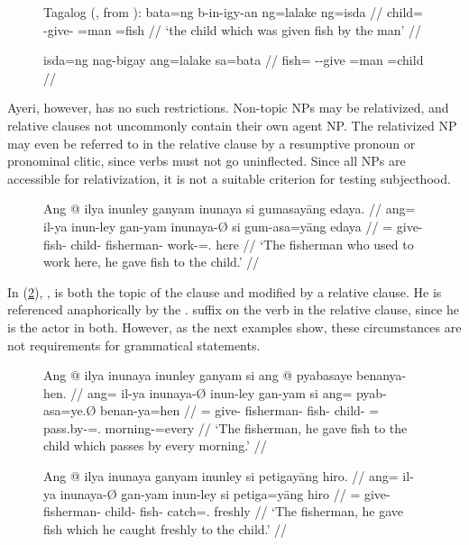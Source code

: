 \begin{figure}[h]
\pex\label{ex:tagrel}%
Tagalog (\cite[24]{kroeger1991}, from \cite[141--142]{foleyvanvalin1984}):
\a\label{ex:tagrel_1}\begingl
	\gla bata=ng b-in-igy-an ng=lalake ng=isda //
	\glb child=\Lnk{} \Pfv{}-give-\Dv{} \Gen{}=man \Gen{}=fish //
	\glft `the child which was given fish by the man' //
\endgl

\a\label{ex:tagrel_2}\ljudge*\begingl
	\gla isda=ng nag-bigay ang=lalake sa=bata //
	\glb fish=\Lnk{} \Av{}-\Pfv{}-give \Nom{}=man \Dat{}=child //
\endgl
\xe
\end{figure}

Ayeri, however, has no such restrictions. Non-topic NPs may be relativized, and
relative clauses not uncommonly contain their own agent NP. The relativized NP
may even be referred to in the relative clause by a resumptive pronoun or
pronominal clitic, since verbs must not go uninflected. Since all NPs are
accessible for relativization, it is not a suitable criterion for testing
subjecthood.

\begin{figure}[h]
\ex\label{ex:ayrrel}\begingl
	\gla Ang @ ilya inunley ganyam inunaya si gumasayāng edaya. //
	\glb ang= il-ya inun-ley gan-yam inunaya-Ø si gum-asa=yāng edaya //
	\glc \AgtT{}= give-\TsgM{} fish-\PargI{} child-\Dat{} fisherman-\Top{} 
		\Rel{} work-\Hab{}=\TsgM{}.\Aarg{} here //
	\glft `The fisherman who used to work here, he gave fish to the child.' //
\endgl\xe
\end{figure}

In (\ref{ex:ayrrel}), , is both the topic
of the clause and modified by a relative clause. He is referenced anaphorically
by the \TsgM{}.\Aarg{} suffix  on the verb in the
relative clause, since he is the actor in both. However, as the next examples
show, these circumstances are not requirements for grammatical statements.

\begin{figure}[h]
\pex\label{ex:ayrrel2}
\a\label{ex:ayrrel2_1}\begingl
	\gla Ang @ ilya inunaya inunley ganyam si ang @ pyabasaye benanya-hen. //
	\glb ang= il-ya inunaya-Ø inun-ley gan-yam si ang= pyab-asa=ye.Ø 
		benan-ya=hen //
	\glc \AgtT{}= give-\TsgM{} fisherman-\Top{} fish-\PargI{} child-\Dat{}
		\Rel{} \AgtT{}= pass.by-\Hab{}=\TsgF{}.\Top{} morning-\Loc{}=every //
	\glft `The fisherman, he gave fish to the child which passes by every
		morning.' //
\endgl

\a\label{ex:ayrrel2_2}\begingl
	\gla Ang @ ilya inunaya ganyam inunley si petigayāng hiro. //
	\glb ang= il-ya inunaya-Ø gan-yam inun-ley si petiga=yāng hiro //
	\glc \AgtT{}= give-\TsgM{} fisherman-\Top{} child-\Dat{} fish-\PargI{}
		\Rel{} catch=\TsgM{}.\Aarg{} freshly //
	\glft `The fisherman, he gave fish which he caught freshly to the 
		child.' //
\endgl
\xe
\end{figure}

